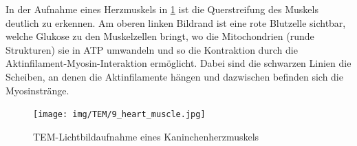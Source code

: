 In der Aufnahme eines Herzmuskels in \cref{fig:tem:muskel} ist die Querstreifung des Muskels deutlich zu erkennen.
Am oberen linken Bildrand ist eine rote Blutzelle sichtbar, welche Glukose zu den Muskelzellen bringt, wo die Mitochondrien (runde Strukturen) sie in ATP umwandeln und so die Kontraktion durch die Aktinfilament-Myosin-Interaktion ermöglicht.
Dabei sind die schwarzen Linien die Scheiben, an denen die Aktinfilamente hängen und dazwischen befinden sich die Myosinstränge.

\begin{figure}[!ht]
    \centering
    \texttt{[image: img/TEM/9\_heart\_muscle.jpg]}
    \caption{TEM-Lichtbildaufnahme eines Kaninchenherzmuskels}
    \label{fig:tem:muskel}
\end{figure}
